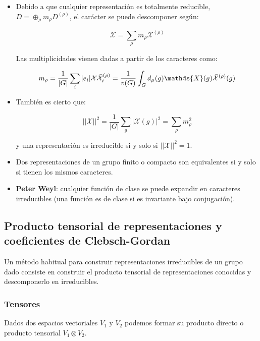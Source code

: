 \documentclass{article}
\begin{document}
    \begin{itemize}
        \item Debido a que cualquier representación es totalmente reducible, $D= \oplus _\rho m_\rho D^{(\rho)}$, el carácter se puede descomponer según:
        
        $$\mathcal{X}=\sum _{\rho} m_\rho \mathcal{X}^{(\rho)}$$
        
        Las multiplicidades vienen dadas a partir de los caracteres como:
        
        $$m_\rho =\frac{1}{|G|}\sum _i |e_i|\mathcal{X}\bar{\mathcal{X}}_i^{(\rho)}=\frac{1}{v(G)}\int _G d_\mu (g)\mathds{X}(g)\Bar{\mathcal{X}}^{(\rho)}(g)$$
        
        \item También es cierto que:
        
        $$||\mathcal{X}||^2=\frac{1}{|G|}\sum _g|\mathcal{X}(g)|^2=\sum _\rho m_\rho ^2$$
        
        y una representación es irreducible si y  solo si  $||\mathcal{X}||^2=1$.
        
        \item Dos representaciones de un grupo finito o compacto son equivalentes si y solo si tienen los mismos caracteres.
        
        \item \textbf{Peter Weyl}: cualquier función de clase se puede expandir en caracteres irreducibles (una función es de clase si es invariante bajo conjugación).
        
    \end{itemize}
    
    \subsection{Producto tensorial de representaciones y coeficientes de Clebsch-Gordan}
    
    Un método habitual para construir representaciones irreducibles de un grupo dado consiste en construir el producto tensorial de representaciones conocidas y descomponerlo en irreducibles.
    
    \subsubsection{Tensores}
    
    Dados dos espacios vectoriales $V_1$ y $V_2$ podemos formar su producto directo o producto tensorial $V_1 \otimes V_2$.
    
\end{document}
